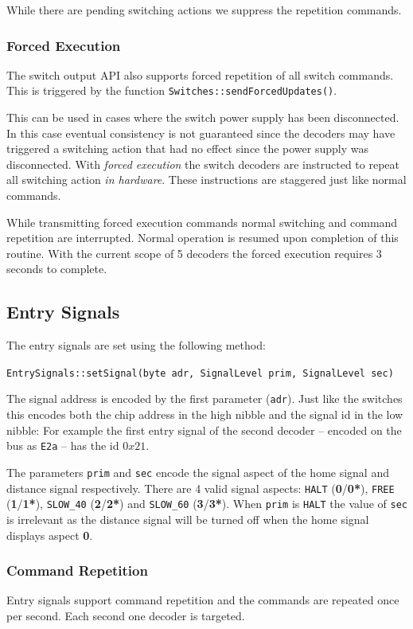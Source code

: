 \documentclass{scrreprt}
\newcommand{\code}[1]{\texttt{#1}}
\begin{document}
While there are pending switching actions we suppress the repetition commands.

\subsubsection{Forced Execution}
The switch output API also supports forced repetition of all switch commands.
This is triggered by the function \code{Switches::sendForcedUpdates()}.

This can be used in cases where the switch power supply has been disconnected.
In this case eventual consistency is not guaranteed since the decoders may have triggered a switching action that had no effect since the power supply was disconnected.
With \emph{forced execution} the switch decoders are instructed to repeat all switching action \emph{in hardware}.
These instructions are staggered just like normal commands.

While transmitting forced execution commands normal switching and command repetition are interrupted.
Normal operation is resumed upon completion of this routine.
With the current scope of 5 decoders the forced execution requires 3 seconds to complete.

\subsection{Entry Signals}
The entry signals are set using the following method:

\code{EntrySignals::setSignal(byte adr, SignalLevel prim, SignalLevel sec)}

The signal address is encoded by the first parameter (\code{adr}).
Just like the switches this encodes both the chip address in the high nibble and the signal id in the low nibble:
For example the first entry signal of the second decoder -- encoded on the bus as \code{E2a} -- has the id $0x21$.

The parameters \code{prim} and \code{sec} encode the signal aspect of the home signal and distance signal respectively.
There are 4 valid signal aspects:
\code{HALT} (\textbf{0}/\textbf{0*}), \code{FREE} (\textbf{1}/\textbf{1*}), \code{SLOW\_40} (\textbf{2}/\textbf{2*}) and \code{SLOW\_60} (\textbf{3}/\textbf{3*}).
When \code{prim} is \code{HALT} the value of \code{sec} is irrelevant as the distance signal will be turned off when the home signal displays aspect \textbf{0}.

\subsubsection{Command Repetition}
Entry signals support command repetition and the commands are repeated once per second.
Each second one decoder is targeted.
\end{document}
